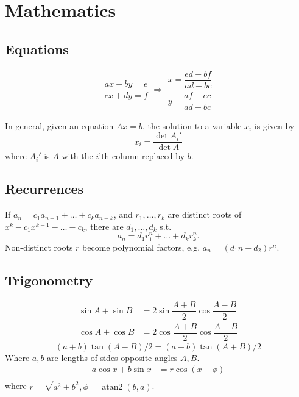 
\chapter{Mathematics}

\section{Equations}


\[\begin{aligned}ax+by=e\\cx+dy=f\end{aligned}
\Rightarrow
\begin{aligned}x=\dfrac{ed-bf}{ad-bc}\\y=\dfrac{af-ec}{ad-bc}\end{aligned}\]

In general, given an equation $Ax = b$, the solution to a variable $x_i$ is given by
\[x_i = \frac{\det A_i'}{\det A} \]
where $A_i'$ is $A$ with the $i$'th column replaced by $b$.

\section{Recurrences}
If $a_n = c_1 a_{n-1} + \dots + c_k a_{n-k}$, and $r_1, \dots, r_k$ are distinct roots of $x^k - c_1 x^{k-1} - \dots - c_k$, there are $d_1, \dots, d_k$ s.t.
\[a_n = d_1r_1^n + \dots + d_kr_k^n. \]
Non-distinct roots $r$ become polynomial factors, e.g. $a_n = (d_1n + d_2)r^n$.

\section{Trigonometry}
\begin{align*}
\sin A+\sin B&{}=2\sin\dfrac{A+B}{2}\cos\dfrac{A-B}{2}\\
\cos A+\cos B&{}=2\cos\dfrac{A+B}{2}\cos\dfrac{A-B}{2}
\end{align*}
\[ (a+b)\tan(A-B)/2{}=(a-b)\tan(A+B)/2 \]
Where $a, b$ are lengths of sides opposite angles $A, B$.
\begin{align*}
	a\cos x+b\sin x&=r\cos(x-\phi)\\
\end{align*}
where $r=\sqrt{a^2+b^2}, \phi=\operatorname{atan2}(b,a)$.

